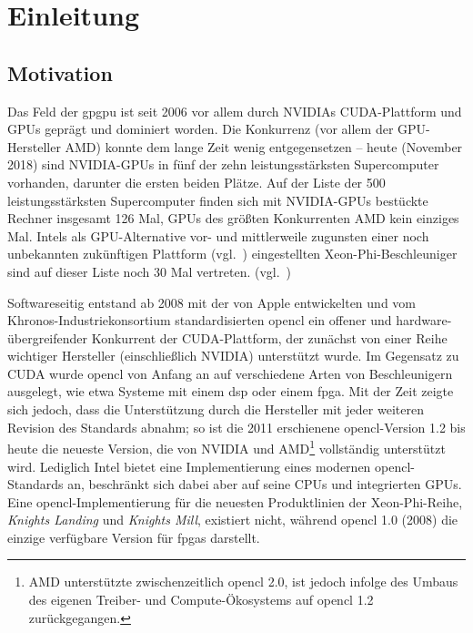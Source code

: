 \section{Einleitung}
\label{einleitung}

\subsection{Motivation}
\label{einleitung:motivation}

Das Feld der \gls{gpgpu} ist seit 2006 vor allem durch NVIDIAs CUDA-Plattform
und GPUs geprägt und dominiert worden. Die Konkurrenz (vor allem der
GPU-Hersteller AMD) konnte dem lange Zeit wenig entgegensetzen -- heute
(November 2018) sind NVIDIA-GPUs in fünf der zehn leistungsstärksten
Supercomputer vorhanden, darunter die ersten beiden Plätze. Auf der Liste der
500 leistungsstärksten Supercomputer finden sich mit NVIDIA-GPUs bestückte
Rechner insgesamt 126 Mal, GPUs des größten Konkurrenten AMD kein einziges Mal.
Intels als GPU-Alternative vor- und mittlerweile zugunsten einer noch
unbekannten zukünftigen Plattform (vgl.~\cite{intel2017}) eingestellten
Xeon-Phi-Beschleuniger sind auf dieser Liste noch 30 Mal vertreten.
(vgl.~\cite{top500})

Softwareseitig entstand ab 2008 mit der von Apple entwickelten und vom
Khronos-Industriekonsortium standardisierten \gls{opencl} ein offener und
hardware-übergreifender Konkurrent der CUDA-Plattform, der zunächst von einer
Reihe wichtiger Hersteller (einschließlich NVIDIA) unterstützt wurde. Im 
Gegensatz zu CUDA wurde \gls{opencl} von Anfang an auf verschiedene Arten von
Beschleunigern ausgelegt, wie etwa Systeme mit einem \gls{dsp} oder einem
\gls{fpga}. Mit der Zeit zeigte sich jedoch, dass die Unterstützung durch die
Hersteller mit jeder weiteren Revision des Standards abnahm; so ist die 2011
erschienene \gls{opencl}-Version 1.2 bis heute die neueste Version, die von
NVIDIA und AMD\footnote{AMD unterstützte zwischenzeitlich \gls{opencl} 2.0, ist
jedoch infolge des Umbaus des eigenen Treiber- und Compute-Ökosystems auf
\gls{opencl} 1.2 zurückgegangen.} vollständig unterstützt wird. Lediglich Intel
bietet eine Implementierung eines modernen \gls{opencl}-Standards an, beschränkt
sich dabei aber auf seine CPUs und integrierten GPUs. Eine
\gls{opencl}-Implementierung für die neuesten Produktlinien der Xeon-Phi-Reihe,
\textit{Knights Landing} und \textit{Knights Mill}, existiert nicht, während
\gls{opencl} 1.0 (2008) die einzige verfügbare Version für \gls{fpga}s
darstellt.


